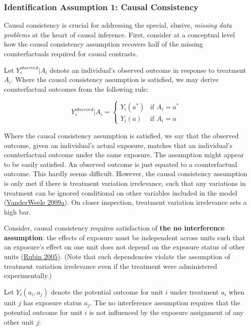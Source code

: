 \documentclass[
  singlecolumn]{article}
\begin{document}
\hypertarget{identification-assumption-1-causal-consistency}{%
\subsubsection{Identification Assumption 1: Causal
Consistency}\label{identification-assumption-1-causal-consistency}}

Causal consistency is crucial for addressing the special, elusive,
\emph{missing data problems} at the heart of causal inference. First,
consider at a conceptual level how the causal consistency assumption
recovers half of the missing counterfactuals required for causal
contrasts.

Let \(Y_i^{observed}|A_i\) denote an individual's observed outcome in
response to treatment \(A_i\). Where the causal consistency assumption
is satisfied, we may derive counterfactual outcomes from the following
rule:

\[
Y_i^{observed}|A_i = 
\begin{cases} 
Y_i(a^*) & \text{if } A_i = a^* \\
Y_i(a) & \text{if } A_i = a
\end{cases}
\]

Where the causal consistency assumption is satisfied, we say that the
observed outcome, given an individual's actual exposure, matches that an
individual's counterfactual outcome under the same exposure. The
assumption might appear to be easily satisfied. An observed outcome is
just equated to a counterfactual outcome. This hardly seems difficult.
However, the causal consistency assumption is only met if there is
treatment variation irrelevance, such that any variations in treatment
can be ignored conditional on other variables included in the model
(\protect\hyperlink{ref-vanderweele2009}{VanderWeele 2009a}). On closer
inspection, treatment variation irrelevance sets a high bar.

Consider, causal consistency requires satisfaction of \textbf{the no
interference assumption}: the effects of exposure must be independent
across units such that an exposure's effect on one unit does not depend
on the exposure status of other units
(\protect\hyperlink{ref-rubin2005}{Rubin 2005}). (Note that such
dependencies violate the assumption of treatment variation irrelevance
even if the treatment were administered experimentally.)

Let \(Y_i(a_i, a_j)\) denote the potential outcome for unit \(i\) under
treatment \(a_i\) when unit \(j\) has exposure status \(a_j\). The no
interference assumption requires that the potential outcome for unit
\(i\) is not influenced by the exposure assignment of any other unit
\(j\):
\end{document}
